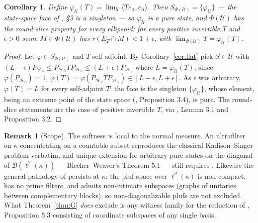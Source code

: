 \documentclass[11pt,reqno]{amsart}
\newtheorem{corollary}[theorem]{Corollary}
\theoremstyle{definition}
\newtheorem{remark}[theorem]{Remark}
\newcommand{\HH}{\mathcal{H}}
\newcommand{\U}{\mathcal{U}}
\newcommand{\lk}{\ell^2(\kappa)}
\newcommand{\Blk}{\mathcal{B}(\ell^2(\kappa))}
\begin{document}
\begin{corollary}\label{cor:I}
Define $\varphi_\U(T)=\lim_{\U}\langle Te_\alpha,e_\alpha\rangle$. Then
$S_{\Phi(\U)}=\{\varphi_\U\}$ --- the state-space face of \cite{FWI}, \S3 is a
singleton --- so $\varphi_\U$ is a pure state, and $\Phi(\U)$ has the round slice
property for every ellipsoid: for every positive invertible $T$ and $\epsilon>0$ some
$M\in\Phi(\U)$ has $r(E_T\cap M)<1+\epsilon$, with
$\lim_{\Phi(\U)}T=\varphi_\U(T)$.
\end{corollary}

\begin{proof}
Let $\varphi\in S_{\Phi(\U)}$ and $T$ self-adjoint. By Corollary~\ref{cor:flat} pick
$S\in\U$ with $(L-\epsilon)P_{\HH_S}\le P_{\HH_S}TP_{\HH_S}\le(L+\epsilon)P_{\HH_S}$
where $L=\varphi_\U(T)$; since $\varphi(P_{\HH_S})=1$,
$\varphi(T)=\varphi(P_{\HH_S}TP_{\HH_S})\in[L-\epsilon,L+\epsilon]$. As $\epsilon$ was
arbitrary, $\varphi(T)=L$ for every self-adjoint $T$: the face is the singleton
$\{\varphi_\U\}$, whose element, being an extreme point of the state space
(\cite{FWI}, Proposition 3.4), is pure. The round-slice statements are the case of
positive invertible $T$, via \cite{FWI}, Lemma 3.1 and Proposition 3.2.
\end{proof}

\begin{remark}[Scope]
The softness is local to the normal measure. An ultrafilter on $\kappa$ concentrating
on a countable subset reproduces the classical Kadison--Singer problem verbatim, and
unique extension for arbitrary pure states on the diagonal of $\Blk$ ---
Blecher--Weaver's Theorem 5.1 --- still requires \cite{MSS}. Likewise the general
pathology of \cite{FWI,FWII} persists at $\kappa$: the pluf space over $\lk$ is
non-compact, has no prime filters, and admits non-intimate subspaces (graphs of
unitaries between complementary blocks), so non-diagonalizable plufs are not excluded.
What Theorem~\ref{thm:G} \emph{does} exclude is any witness family for the reduction
of \cite{FWII}, Proposition 5.3 consisting of coordinate subspaces of any single
basis.
\end{remark}
\end{document}
